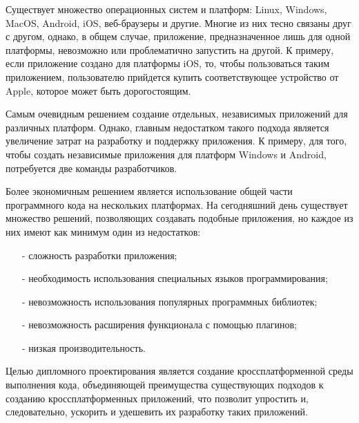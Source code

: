 Существует множество операционных систем и платформ: Linux, Windows, MacOS, Android, iOS, веб-браузеры и другие.
Многие из них тесно связаны друг с другом, однако, в общем случае, приложение, предназначенное лишь для одной платформы, невозможно или проблематично запустить на другой.
К примеру, если приложение создано для платформы iOS, то, чтобы пользоваться таким приложением, пользователю прийдется купить соответствующее устройство от Apple, которое может быть дорогостоящим.

Самым очевидным решением создание отдельных, независимых приложений для различных платформ.
Однако, главным недостатком такого подхода является увеличение затрат на разработку и поддержку приложения. 
К примеру, для того, чтобы создать независимые приложения для платформ Windows и Android, потребуется две команды разработчиков.

Более экономичным решением является использование общей части программного кода на нескольких платформах.
На сегодняшний день существует множество решений, позволяющих создавать подобные приложения, но каждое из них имеют как минимум один из недостатков:
\begin{itemize}
    \item[-] сложность разработки приложения;
    \item[-] необходимость использования специальных языков программирования;
    \item[-] невозможность использования популярных программных библиотек;
    \item[-] невозможность расширения функционала с помощью плагинов;
    \item[-] низкая производительность.
\end{itemize}

Целью дипломного проектирования является создание кроссплатформенной среды выполнения кода, объединяющей преимущества существующих подходов к созданию кроссплатформенных приложений, что позволит упростить и, следовательно, ускорить и удешевить их разработку таких приложений.
